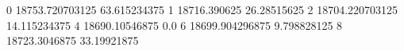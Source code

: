 0 18753.720703125 63.615234375
1 18716.390625 26.28515625
2 18704.220703125 14.115234375
4 18690.10546875 0.0
6 18699.904296875 9.798828125
8 18723.3046875 33.19921875
